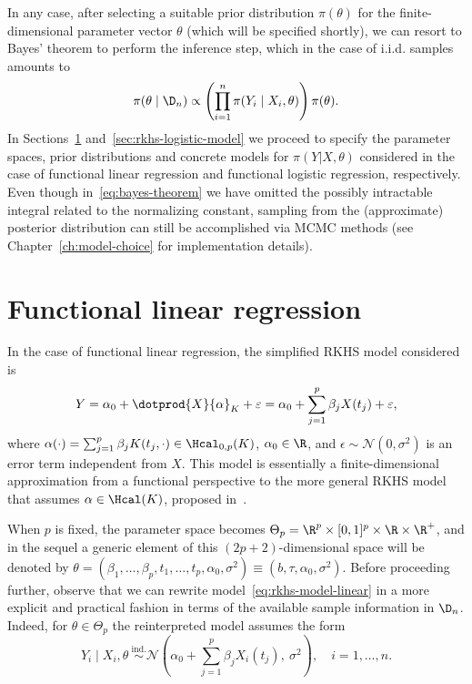 In any case, after selecting a suitable prior distribution \(\pi(\theta)\) for the finite-dimensional parameter vector \(\theta\) (which will be specified shortly), we can resort to Bayes' theorem to perform the inference step, which in the case of i.i.d. samples amounts to
\begin{equation}\label{eq:bayes-theorem}
  \pi(\theta \mid \D_n) \propto \left( \prod_{i=1}^n \pi(Y_i\mid X_i, \theta) \right)\pi(\theta).
\end{equation}
In Sections~\ref{sec:rkhs-linear-model} and~\ref{sec:rkhs-logistic-model} we proceed to specify the parameter spaces, prior distributions and concrete models for \(\pi(Y | X,\theta)\) considered in the case of functional linear regression and functional logistic regression, respectively. Even though in~\eqref{eq:bayes-theorem} we have omitted the possibly intractable integral related to the normalizing constant, sampling from the (approximate) posterior distribution can still be accomplished via MCMC methods (see Chapter~\ref{ch:model-choice} for implementation details).

\section{Functional linear regression}\label{sec:rkhs-linear-model}

In the case of functional linear regression, the simplified RKHS model considered is
\begin{equation}\label{eq:rkhs-model-linear}
  Y = \alpha_0 + \dotprod{X}{\alpha}_K + \epsilon = \alpha_0 + \sum_{j=1}^p \beta_j X(t_j) + \epsilon,
\end{equation}
where \(\alpha(\cdot) = \sum_{j=1}^p \beta_j K(t_j, \cdot) \in \Hcal_{0,p}(K)\), \(\alpha_0\in\R\), and \(\epsilon \sim \mathcal N(0, \sigma^2)\) is an error term independent from \(X\). This model is essentially a finite-dimensional approximation from a functional perspective to the more general RKHS model that assumes \(\alpha \in \Hcal(K)\), proposed in~\citet{berrendero2019rkhs}.

When \(p\) is fixed, the parameter space becomes \(\Theta_p = \R^p \times [0, 1]^p \times \R \times \R^+\), and in the sequel a generic element of this \((2p+2)\)-dimensional space will be denoted by \(\theta = (\beta_1,\dots, \beta_p, t_1,\dots, t_p, \alpha_0, \sigma^2) \equiv (b, \tau, \alpha_0, \sigma^2)\). Before proceeding further, observe that we can rewrite model~\eqref{eq:rkhs-model-linear} in a more explicit and practical fashion in terms of the available sample information in \(\D_n\). Indeed, for \(\theta \in \Theta_p\) the reinterpreted model assumes the form
\begin{equation}\label{eq:rkhs-model-linear-2}
  Y_i \mid X_i, \theta \ \stackrel{\text{ind.}}{\sim} \mathcal N\left(\alpha_0 + \sum_{j=1}^p \beta_j X_i(t_j), \ \sigma^2\right), \quad i =1,\dots, n.
\end{equation}

